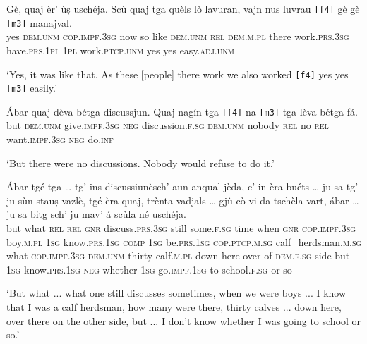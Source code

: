 \begin{linenumbers}
	\gll Gè, quaj èr’ ùṣ uschéja. Scù quaj tga quèls lò lavuran, vajn nus luvrau \texttt{[f4]} gè gè \texttt{[m3]} manajval.   \\
yes \textsc{dem.unm} \textsc{cop.impf.3sg} now so like \textsc{dem.unm} \textsc{rel} \textsc{dem.m.pl} there work.\textsc{prs.3sg} have\textsc{.prs.1pl} \textsc{1pl} work.\textsc{ptcp.unm} {} yes yes {} easy.\textsc{adj.unm}	\\
\end{linenumbers}
\medskip
\glt `Yes, it was like that. As these [people] there work we also worked \texttt{[f4]} yes yes \texttt{[m3]} easily.'
\medskip

\begin{linenumbers}
	\gll Ábar quaj dèva bétga discussjun. Quaj nagín tga \texttt{[f4]} na \texttt{[m3]} tga lèva bétga fá.\\
	but \textsc{dem.unm} give.\textsc{impf.3sg} \textsc{neg} discussion.\textsc{f.sg} \textsc{dem.unm} nobody \textsc{rel} {} no {} \textsc{rel} want.\textsc{impf.3sg} \textsc{neg} do.\textsc{inf}\\
\end{linenumbers}
\medskip
\glt `But there were no discussions. Nobody would refuse to do it.'
\medskip

\begin{linenumbers}
	\gll Ábar tgé tga … tg’ ins discussiunèsch’ aun anqual jèda, c’ in èra buéts … ju sa tg’ ju sùn stauṣ vazlè, tgé èra quaj, trènta vadjals … gjù cò vi da tschèla vart, ábar … ju sa bitg  sch’ ju mav’ á scùla né uschéja.   \\
	but what \textsc{rel} {} \textsc{rel} \textsc{gnr} discuss.\textsc{prs.3sg} still some.\textsc{f.sg} time when \textsc{gnr} \textsc{cop.impf.3sg} boy.\textsc{m.pl} {} \textsc{1sg} know.\textsc{prs.1sg} \textsc{comp} \textsc{1sg} be.\textsc{prs.1sg} \textsc{cop.ptcp.m.sg} calf\_herdsman.\textsc{m.sg} what \textsc{cop.impf.3sg} \textsc{dem.unm} thirty calf.\textsc{m.pl} {} down here over of \textsc{dem.f.sg} side but {} \textsc{1sg} know.\textsc{prs.1sg} \textsc{neg} whether \textsc{1sg} go.\textsc{impf.1sg} to school.\textsc{f.sg} or so \\
\end{linenumbers}
\medskip
\glt `But what ... what one still discusses sometimes, when we were boys ... I know that I was a calf herdsman, how many were there, thirty calves ... down here, over there on the other side, but ... I don't know whether I was going to school or so.'
\medskip

